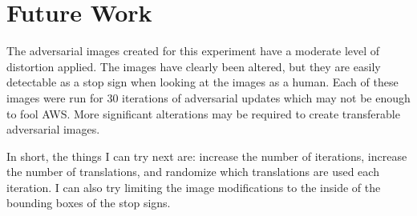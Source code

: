 \documentclass{article}
\begin{document}
\section{Future Work}

The adversarial images created for this experiment have a moderate level of distortion applied. The images have clearly been altered, but they are easily detectable as a stop sign when looking at the images as a human. Each of these images were run for 30 iterations of adversarial updates which may not be enough to fool AWS. More significant alterations may be required to create transferable adversarial images.

In short, the things I can try next are: increase the number of iterations, increase the number of translations, and randomize which translations are used each iteration. I can also try limiting the image modifications to the inside of the bounding boxes of the stop signs.

\clearpage


\end{document}
